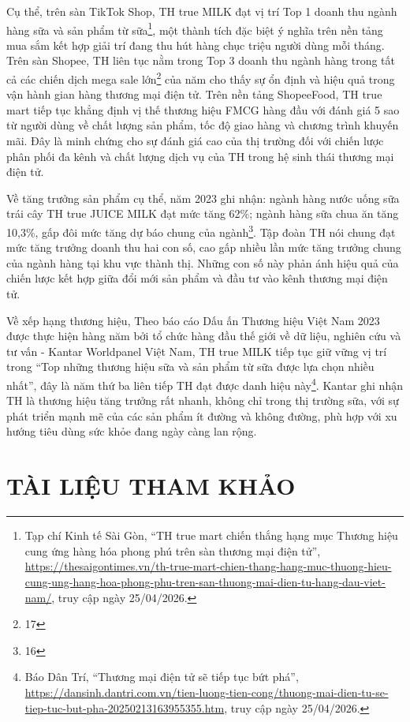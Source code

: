 Cụ thể, trên sàn TikTok Shop, TH true MILK đạt vị trí Top 1 doanh thu
ngành hàng sữa và sản phẩm từ sữa\footnote{Tạp chí Kinh tế Sài Gòn, ``TH
  true mart chiến thắng hạng mục Thương hiệu cung ứng hàng hóa phong phú
  trên sàn thương mại điện tử'',
  \url{https://thesaigontimes.vn/th-true-mart-chien-thang-hang-muc-thuong-hieu-cung-ung-hang-hoa-phong-phu-tren-san-thuong-mai-dien-tu-hang-dau-viet-nam/},
  truy cập ngày 25/04/2026.}, một thành tích đặc biệt ý nghĩa trên nền
tảng mua sắm kết hợp giải trí đang thu hút hàng chục triệu người dùng
mỗi tháng. Trên sàn Shopee, TH liên tục nằm trong Top 3 doanh thu ngành
hàng trong tất cả các chiến dịch mega sale lớn\footnote{17} của năm cho
thấy sự ổn định và hiệu quả trong vận hành gian hàng thương mại điện tử.
Trên nền tảng ShopeeFood, TH true mart tiếp tục khẳng định vị thế thương
hiệu FMCG hàng đầu với đánh giá 5 sao từ người dùng về chất lượng sản
phẩm, tốc độ giao hàng và chương trình khuyến mãi. Đây là minh chứng cho
sự đánh giá cao của thị trường đối với chiến lược phân phối đa kênh và
chất lượng dịch vụ của TH trong hệ sinh thái thương mại điện tử.

Về tăng trưởng sản phẩm cụ thể, năm 2023 ghi nhận: ngành hàng nước uống
sữa trái cây TH true JUICE MILK đạt mức tăng 62\%; ngành hàng sữa chua
ăn tăng 10,3\%, gấp đôi mức tăng dự báo chung của ngành\footnote{16}.
Tập đoàn TH nói chung đạt mức tăng trưởng doanh thu hai con số, cao gấp
nhiều lần mức tăng trưởng chung của ngành hàng tại khu vực thành thị.
Những con số này phản ánh hiệu quả của chiến lược kết hợp giữa đổi mới
sản phẩm và đầu tư vào kênh thương mại điện tử.

Về xếp hạng thương hiệu, Theo báo cáo Dấu ấn Thương hiệu Việt Nam 2023
được thực hiện hàng năm bởi tổ chức hàng đầu thế giới về dữ liệu, nghiên
cứu và tư vấn - Kantar Worldpanel Việt Nam, TH true MILK tiếp tục giữ
vững vị trí trong ``Top những thương hiệu sữa và sản phẩm từ sữa được
lựa chọn nhiều nhất'', đây là năm thứ ba liên tiếp TH đạt được danh hiệu
này\footnote{Báo Dân Trí, ``Thương mại điện tử sẽ tiếp tục bứt phá'',
  \url{https://dansinh.dantri.com.vn/tien-luong-tien-cong/thuong-mai-dien-tu-se-tiep-tuc-but-pha-20250213163955355.htm},
  truy cập ngày 25/04/2026.}. Kantar ghi nhận TH là thương hiệu tăng
trưởng rất nhanh, không chỉ trong thị trường sữa, với sự phát triển mạnh
mẽ của các sản phẩm ít đường và không đường, phù hợp với xu hướng tiêu
dùng sức khỏe đang ngày càng lan rộng.



\section*{TÀI LIỆU THAM KHẢO}

